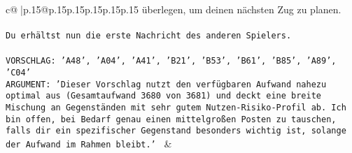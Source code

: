 \documentclass{article}
\begin{document}
{\begin{supertabular}{c@{$\;$}|p{.15\linewidth}@{}p{.15\linewidth}p{.15\linewidth}p{.15\linewidth}p{.15\linewidth}p{.15\linewidth}}
{{{überlegen, um deinen nächsten Zug zu planen.\\ \tt \\ \tt Du erhältst nun die erste Nachricht des anderen Spielers.\\ \tt \\ \tt VORSCHLAG: {'A48', 'A04', 'A41', 'B21', 'B53', 'B61', 'B85', 'A89', 'C04'}\\ \tt ARGUMENT: {'Dieser Vorschlag nutzt den verfügbaren Aufwand nahezu optimal aus (Gesamtaufwand 3680 von 3681) und deckt eine breite Mischung an Gegenständen mit sehr gutem Nutzen-Risiko-Profil ab. Ich bin offen, bei Bedarf genau einen mittelgroßen Posten zu tauschen, falls dir ein spezifischer Gegenstand besonders wichtig ist, solange der Aufwand im Rahmen bleibt.'} 
	  } 
	   } 
	   } 
	 & \\ 
 

    \theutterance {}  


\end{supertabular}}
\end{document}
